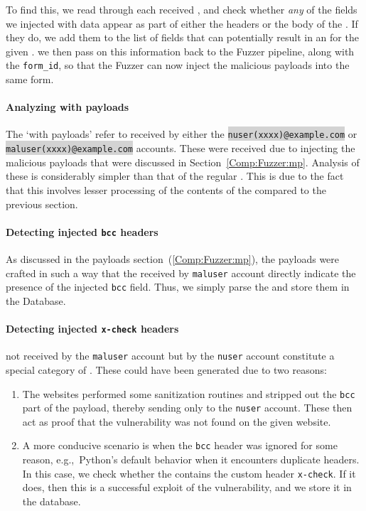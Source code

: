 To find this, we read through each received \email, and check whether \emph{any} of the fields we injected with data appear as part of either the headers or the body of the \email. If they do, we add them to the list of fields that can potentially result in an \ehi for the given \email. we then pass on this information back to the Fuzzer pipeline, along with the \texttt{form\_id}, so that the Fuzzer can now inject the malicious payloads into the same form.

\paragraph{Analyzing \email with payloads}
The `\emails with payloads' refer to \emails received by either the \colorbox{lightgray}{\lstinline{nuser(xxxx)@example.com}} or \colorbox{lightgray}{\lstinline{maluser(xxxx)@example.com}} accounts. These \emails were received due to injecting the malicious payloads that were discussed in Section~\ref{Comp:Fuzzer:mp}. Analysis of these \emails is considerably simpler than that of the regular \emails. This is due to the fact that this involves lesser processing of the contents of the \email compared to the previous section.
\paragraph{Detecting injected \texttt{bcc} headers}
As discussed in the payloads section~(\ref{Comp:Fuzzer:mp}), the payloads were crafted in such a way that the \emails received by \texttt{maluser} account directly indicate the presence of the injected \texttt{bcc} field. Thus, we simply parse the \emails and store them in the Database.

\label{analyze:detect_x_check}
\paragraph{Detecting injected \texttt{x-check} headers}
\Emails not received by the \texttt{maluser} account but by the \texttt{nuser} account constitute a special category of \emails.
These \emails could have been generated due to two reasons:
\begin{enumerate}
	\item The websites performed some sanitization routines and stripped out the \texttt{bcc} part of the payload, thereby sending \emails only to the \texttt{nuser} account. These \emails then act as proof that the vulnerability was not found on the given website.
	\item A more conducive scenario is when the \texttt{bcc} header was ignored for some reason, e.g.,\ Python's default behavior when it encounters duplicate headers. In this case, we check whether the \email contains the custom header \texttt{x-check}. If it does, then this is a successful exploit of the vulnerability, and we store it in the database.
\end{enumerate}
